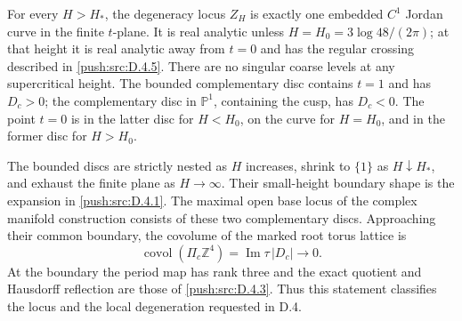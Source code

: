 \begin{proposition}\label{push:src:D.4.8}
For every \(H>H_*\), the degeneracy locus \(Z_H\) is exactly one
embedded \(C^1\) Jordan curve in the finite \(t\)-plane. It is
real analytic unless \(H=H_0=3\log48/(2\pi)\); at that height it
is real analytic away from \(t=0\) and has the regular crossing
described in \ref{push:src:D.4.5}. There are no singular coarse levels at any
supercritical height. The bounded complementary disc contains
\(t=1\) and has \(D_c>0\); the complementary disc in
\(\mathbb P^1\), containing the cusp, has \(D_c<0\). The point
\(t=0\) is in the latter disc for \(H<H_0\), on the curve for
\(H=H_0\), and in the former disc for \(H>H_0\).

The bounded discs are strictly nested as \(H\) increases, shrink
to \(\{1\}\) as \(H\downarrow H_*\), and exhaust the finite
plane as \(H\to\infty\). Their small-height boundary shape is
the expansion in \ref{push:src:D.4.1}. The maximal open base locus of the complex
manifold construction consists of these two complementary discs.
Approaching their common boundary, the covolume of the marked
root torus lattice is
\[
 \operatorname{covol}(\Pi_c\mathbb Z^4)
       =\operatorname{Im}\tau\,|D_c|\longrightarrow0.
\]
At the boundary the period map has rank three and the exact quotient
and Hausdorff reflection are those of \ref{push:src:D.4.3}. Thus this statement
classifies the locus and the local degeneration requested in D.4.
\end{proposition}

